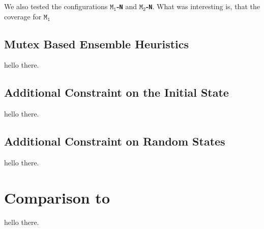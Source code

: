We also tested the configurations \textbf{$\texttt{M}_\texttt{1}$-\texttt{N}} and \textbf{$\texttt{M}_\texttt{2}$-\texttt{N}}.
What was interesting is, that the coverage for \textbf{$\texttt{M}_\texttt{1}$}


\subsection{Mutex Based Ensemble Heuristics}\label{subsec:mutex-based-ensemble-heuristics}
hello there.

\subsection{Additional Constraint on the Initial State}\label{subsec:additional-constraint-on-the-initial-state}
hello there.

\subsection{Additional Constraint on Random States}\label{subsec:additional-constraint-on-random-states}
hello there.


\section{Comparison to}\label{sec:comparison-to-fiser}
hello there.
